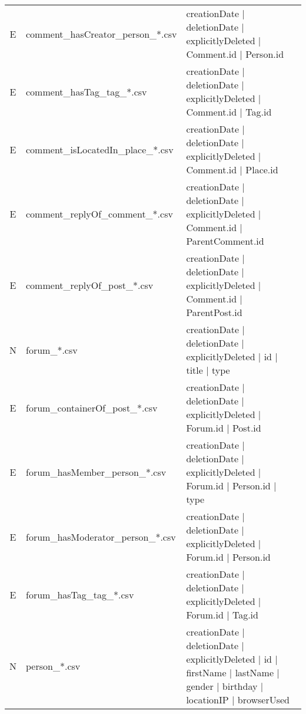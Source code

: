 \begin{table}[htb]
\begin{tabular}{|c|l|l|}
        E                    & comment\_hasCreator\_person\_*.csv      & creationDate | deletionDate | explicitlyDeleted | Comment.id | Person.id                                                             \\
        E                    & comment\_hasTag\_tag\_*.csv             & creationDate | deletionDate | explicitlyDeleted | Comment.id | Tag.id                                                                \\
        E                    & comment\_isLocatedIn\_place\_*.csv      & creationDate | deletionDate | explicitlyDeleted | Comment.id | Place.id                                                              \\
        E                    & comment\_replyOf\_comment\_*.csv        & creationDate | deletionDate | explicitlyDeleted | Comment.id | ParentComment.id                                                      \\
        E                    & comment\_replyOf\_post\_*.csv           & creationDate | deletionDate | explicitlyDeleted | Comment.id | ParentPost.id                                                         \\
        \hline
        N                    & forum\_*.csv                            & creationDate | deletionDate | explicitlyDeleted | id | title | type                                                                  \\
        E                    & forum\_containerOf\_post\_*.csv         & creationDate | deletionDate | explicitlyDeleted | Forum.id | Post.id                                                                 \\
        E                    & forum\_hasMember\_person\_*.csv         & creationDate | deletionDate | explicitlyDeleted | Forum.id | Person.id | type                                                        \\
        E                    & forum\_hasModerator\_person\_*.csv      & creationDate | deletionDate | explicitlyDeleted | Forum.id | Person.id                                                               \\
        E                    & forum\_hasTag\_tag\_*.csv               & creationDate | deletionDate | explicitlyDeleted | Forum.id | Tag.id                                                                  \\
        \hline
        N                    & person\_*.csv                           & creationDate | deletionDate | explicitlyDeleted | id | firstName | lastName | gender | birthday | locationIP | browserUsed           \\

\end{tabular}
\end{table}
